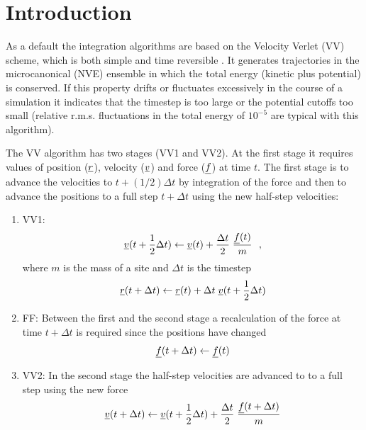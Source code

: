 \section{Introduction}

As a default the \D integration algorithms are
based on the Velocity Verlet (VV) scheme,
which is both simple and time reversible \cite{allen-89a}.  It
generates trajectories in the microcanonical (NVE) ensemble in
which the total energy (kinetic plus potential) is conserved.  If
this property drifts or fluctuates excessively in the course of a
simulation it indicates that the timestep is too large or the
potential cutoffs too small (relative r.m.s. fluctuations in the
total energy of $10^{-5}$ are typical with this algorithm).

The VV algorithm has two stages (VV1 and VV2). At the first stage
it requires values of position ($\mbox{$\underline{r}$}$), velocity ($\mbox{$\underline{v}$}$)
and force ($\mbox{$\underline{f}$}$) at time $t$.  The first stage is to advance
the velocities to $t+(1/2)\Delta t$ by integration of the force
and then to advance the positions to a full step $t+\Delta t$
using the new half-step velocities:
\begin{enumerate}
\item VV1:
\begin{equation}
\mbox{$\underline{v}$}(t + {1 \over 2} \Delta t) \leftarrow \mbox{$\underline{v}$}(t) + {\Delta t \over 2} \;
{\mbox{$\underline{f}$}(t) \over m}~~,
\end{equation}
where $m$ is the mass of a site and $\Delta t$ is the timestep
\begin{equation}
\mbox{$\underline{r}$}(t + \Delta t) \leftarrow \mbox{$\underline{r}$}(t) + \Delta t \;
\mbox{$\underline{v}$}(t + {1 \over 2}\Delta t)
\end{equation}
\item FF:
\newline Between the first and the second stage a recalculation of the force
at time $t+\Delta t$ is required since the positions have changed
\begin{equation}
\mbox{$\underline{f}$}(t + \Delta t) \leftarrow \mbox{$\underline{f}$}(t)
\end{equation}
\item VV2:
\newline In the second stage the half-step velocities
are advanced to to a full step using the new force
\begin{equation}
\mbox{$\underline{v}$}(t + \Delta t) \leftarrow  \mbox{$\underline{v}$}(t + {1 \over 2} \Delta t) +
{\Delta t \over 2} \; {\mbox{$\underline{f}$}(t + \Delta t) \over m}
\end{equation}
\end{enumerate}

